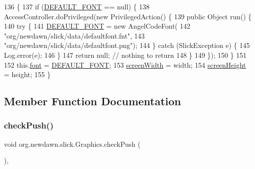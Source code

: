 \begin{DoxyCode}
136                                            \{
137         \textcolor{keywordflow}{if} (\mbox{\hyperlink{classorg_1_1newdawn_1_1slick_1_1_graphics_a5012bdee04bc821457bcc5fdcd23c5c6}{DEFAULT\_FONT}} == null) \{
138             AccessController.doPrivileged(\textcolor{keyword}{new} PrivilegedAction() \{
139                 \textcolor{keyword}{public} Object run() \{
140                     \textcolor{keywordflow}{try} \{
141                         \mbox{\hyperlink{classorg_1_1newdawn_1_1slick_1_1_graphics_a5012bdee04bc821457bcc5fdcd23c5c6}{DEFAULT\_FONT}} = \textcolor{keyword}{new} AngelCodeFont(
142                                 \textcolor{stringliteral}{"org/newdawn/slick/data/defaultfont.fnt"},
143                                 \textcolor{stringliteral}{"org/newdawn/slick/data/defaultfont.png"});
144                     \} \textcolor{keywordflow}{catch} (SlickException e) \{
145                         Log.error(e);
146                     \}
147                     \textcolor{keywordflow}{return} null; \textcolor{comment}{// nothing to return}
148                 \}
149             \});
150         \}
151         
152         this.\mbox{\hyperlink{classorg_1_1newdawn_1_1slick_1_1_graphics_a3fc899a622817cc89e2c9f0111243b65}{font}} = \mbox{\hyperlink{classorg_1_1newdawn_1_1slick_1_1_graphics_a5012bdee04bc821457bcc5fdcd23c5c6}{DEFAULT\_FONT}};
153         \mbox{\hyperlink{classorg_1_1newdawn_1_1slick_1_1_graphics_adbb4b10050a8bcf8e496130509784f71}{screenWidth}} = width;
154         \mbox{\hyperlink{classorg_1_1newdawn_1_1slick_1_1_graphics_a24cd14275ad2dcd82fcd843ceab6a80b}{screenHeight}} = height;
155     \}
\end{DoxyCode}


\subsection{Member Function Documentation}
\mbox{\label{classorg_1_1newdawn_1_1slick_1_1_graphics_a58dfa60d60ec7f56b17e420458b3724e}} 
\subsubsection{\texorpdfstring{check\+Push()}{checkPush()}}
{\footnotesize\ttfamily void org.\+newdawn.\+slick.\+Graphics.\+check\+Push (\begin{DoxyParamCaption}{ }\end{DoxyParamCaption})\hspace{0.3cm}{\ttfamily [inline]}, {\ttfamily [private]}}

